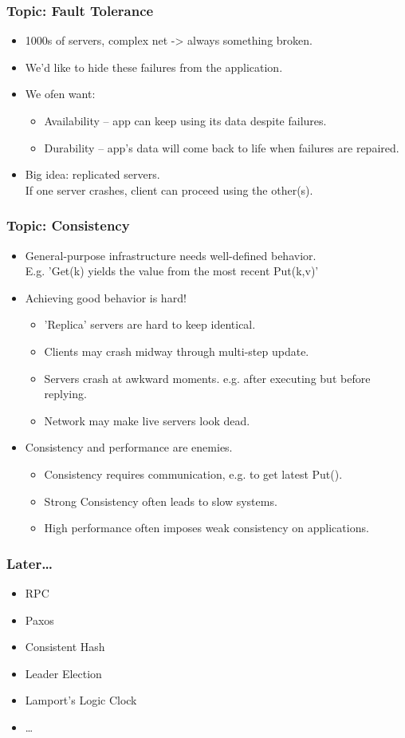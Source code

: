 \begin{frame}
    \frametitle{Topic: Fault Tolerance}
    \begin{itemize}
        \item 1000s of servers, complex net -> always something broken.
        \item We'd like to hide these failures from the application.
        \item We ofen want:
        \begin{itemize}
            \item Availability  -- app can keep using its data despite failures. \\
            \item Durability -- app's data will come back to life when failures are repaired. \\
        \end{itemize}
        \item Big idea: replicated servers. \\
        If one server crashes, client can proceed using the other(s).
    \end{itemize}
\end{frame}

\begin{frame}
    \frametitle{Topic: Consistency}
    \begin{itemize}
        \item General-purpose infrastructure needs well-defined behavior. \\
            E.g. 'Get(k) yields the value from the most recent Put(k,v)'
        \item Achieving good behavior is hard!
        \begin{itemize}
            \item 'Replica' servers are hard to keep identical.
            \item Clients may crash midway through multi-step update.
            \item Servers crash at awkward moments. e.g. after executing but before replying.
            \item Network may make live servers look dead.
        \end{itemize}
        \item Consistency and performance are enemies.
        \begin{itemize}
            \item Consistency requires communication, e.g. to get latest Put().
            \item \alert{Strong Consistency} often leads to slow systems.
            \item High performance often imposes \alert{weak consistency} on applications.
        \end{itemize}
    \end{itemize}
\end{frame}

\begin{frame}
    \frametitle{Later\ldots}
    \begin{itemize}
        \item RPC
        \item Paxos
        \item Consistent Hash
        \item Leader Election
        \item Lamport's Logic Clock
        \item \ldots
    \end{itemize}
\end{frame}
